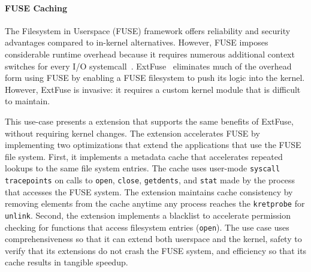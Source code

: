 





\paragraph{FUSE Caching}

The Filesystem in Userspace (FUSE) framework offers reliability and security advantages compared to in-kernel alternatives.  However, FUSE imposes considerable runtime overhead because it requires numerous additional context switches for every I/O systemcall~\cite{Vangoor17}.  ExtFuse~\cite{Bijlani19} eliminates much of the overhead form using FUSE by enabling a FUSE filesystem to push its logic into the kernel.  However, ExtFuse is invasive: it requires a custom kernel module that is difficult to maintain. 

This use-case presents a \sys extension that supports the same benefits of ExtFuse, without requiring kernel changes.  The extension accelerates FUSE by implementing two optimizations that extend the applications that use the FUSE file system.  First, it implements a metadata cache that accelerates repeated lookups to the same file system entries.  The cache uses user-mode \texttt{syscall tracepoints} on calls to \texttt{open}, \texttt{close}, \texttt{getdents}, and \texttt{stat} made by the process that accesses the FUSE system.  The extension maintains cache consistency by removing elements from the cache anytime any process reaches the \texttt{kretprobe} for \texttt{unlink}.  Second, the extension implements a blacklist to accelerate permission checking for functions that access filesystem entries (\eg \texttt{open}).  The use case uses \sys{} comprehensiveness so that it can extend both userspace and the kernel, safety to verify that its extensions do not crash the FUSE system, and efficiency so that its cache results in tangible speedup.

